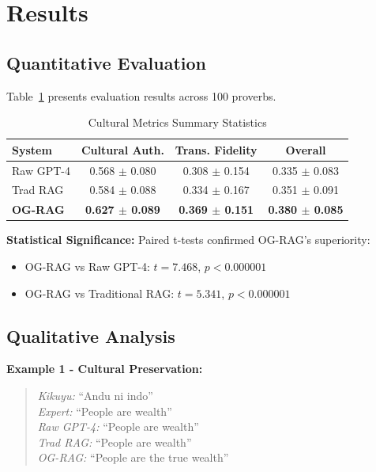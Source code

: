 \documentclass[sigconf,nonacm]{acmart}
\begin{document}
\section{Results}

\subsection{Quantitative Evaluation}

Table~\ref{tab:results} presents evaluation results across 100 proverbs.

\begin{table}[h]
\centering
\caption{Cultural Metrics Summary Statistics}
\label{tab:results}
\begin{tabular}{lccc}
\toprule
\textbf{System} & \textbf{Cultural Auth.} & \textbf{Trans. Fidelity} & \textbf{Overall} \\
\midrule
Raw GPT-4 & 0.568 $\pm$ 0.080 & 0.308 $\pm$ 0.154 & 0.335 $\pm$ 0.083 \\
Trad RAG & 0.584 $\pm$ 0.088 & 0.334 $\pm$ 0.167 & 0.351 $\pm$ 0.091 \\
\textbf{OG-RAG} & \textbf{0.627 $\pm$ 0.089} & \textbf{0.369 $\pm$ 0.151} & \textbf{0.380 $\pm$ 0.085} \\
\bottomrule
\end{tabular}
\end{table}

\textbf{Statistical Significance:} Paired t-tests confirmed OG-RAG's superiority:
\begin{itemize}
    \item OG-RAG vs Raw GPT-4: $t = 7.468$, $p < 0.000001$
    \item OG-RAG vs Traditional RAG: $t = 5.341$, $p < 0.000001$
\end{itemize}

\subsection{Qualitative Analysis}

\textbf{Example 1 - Cultural Preservation:}

\begin{quote}
\textit{Kikuyu:} ``Andu ni indo''\\
\textit{Expert:} ``People are wealth''\\
\textit{Raw GPT-4:} ``People are wealth''\\
\textit{Trad RAG:} ``People are wealth''\\
\textit{OG-RAG:} ``People are the true wealth''
\end{quote}
\end{document}
